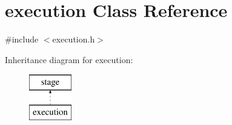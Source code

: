 \hypertarget{classexecution}{
\section{execution Class Reference}
\label{classexecution}
}


{\ttfamily \#include $<$execution.h$>$}

Inheritance diagram for execution:\begin{figure}[H]
\begin{center}
\leavevmode
\includegraphics[height=2.000000cm]{classexecution}
\end{center}
\end{figure}
